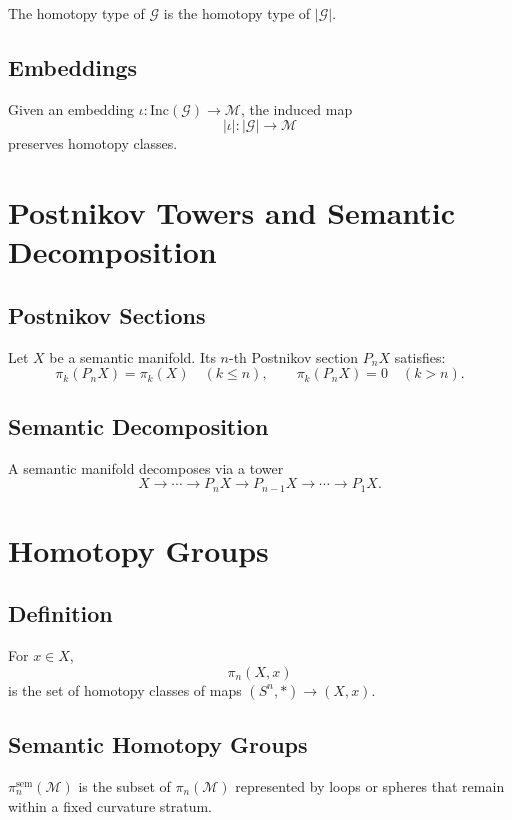 \begin{definition}
The homotopy type of $\mathcal{G}$ is the homotopy type of $|\mathcal{G}|$.
\end{definition}

\subsection{Embeddings}

Given an embedding $\iota:\mathrm{Inc}(\mathcal{G})\to\mathcal{M}$, the induced map  
\[
|\iota|:|\mathcal{G}|\to\mathcal{M}
\]
preserves homotopy classes.

\section{Postnikov Towers and Semantic Decomposition}

\subsection{Postnikov Sections}

Let $X$ be a semantic manifold.  
Its $n$-th Postnikov section $P_n X$ satisfies:
\[
\pi_k(P_n X) = \pi_k(X) \quad (k\le n),
\qquad
\pi_k(P_n X) = 0 \quad (k>n).
\]

\subsection{Semantic Decomposition}

A semantic manifold decomposes via a tower
\[
X \to \cdots \to P_nX \to P_{n-1}X \to \cdots \to P_1X.
\]

\section{Homotopy Groups}

\subsection{Definition}

For $x\in X$,
\[
\pi_n(X,x)
\]
is the set of homotopy classes of maps $(S^n,*)\to(X,x)$.

\subsection{Semantic Homotopy Groups}

\begin{definition}
$\pi_n^{\mathrm{sem}}(\mathcal{M})$ is the subset of $\pi_n(\mathcal{M})$ represented by loops or spheres that remain within a fixed curvature stratum.
\end{definition}

